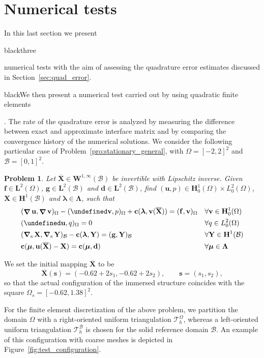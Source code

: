 \documentclass[oneside]{amsart} %
\newtheorem{pro}{Problem}
\let\div\undefined\DeclareMathOperator{\div}{div} %
\DeclareMathOperator*{\Grad}{\boldsymbol\nabla}
\DeclareMathOperator{\grads}{\boldsymbol\nabla_s}
\newcommand\Huo{\mathbf{H}^1_0(\Omega)}%
\newcommand\Ldo{L^2_0(\Omega)} %
\newcommand\Hub{\mathbf{H}^1(\B)} %
\newcommand\LdBd{\mathbf{L}^2(\B)} %
\newcommand\LdOd{\mathbf{L}^2(\Omega)} %
\newcommand\Winftyd{\mathbf{W}^{1,\infty}(\B)}
\newcommand\B{\mathcal B} %
\renewcommand\u{\mathbf{u}} %
\renewcommand\v{\mathbf{v}} %
\renewcommand\d{\mathbf{d}} %
\renewcommand\c{\mathbf{c}} %
\newcommand\f{\mathbf{f}} %
\newcommand\g{\mathbf{g}} %
\newcommand\s{\mathbf{s}} %
\newcommand\X{\mathbf{X}} %
\newcommand\Xbar{\overline{\X}} %
\newcommand\Y{\mathbf{Y}} %
\newcommand\LL{{\boldsymbol{\Lambda}}} %
\newcommand\llambda{\boldsymbol\lambda} %
\newcommand\mmu{{\boldsymbol\mu}} %
\newcommand\T{\mathcal{T}} %
\newcommand\DB{\begin{color}{black}}
\newcommand\BD{\end{color}}
\begin{document}
	\section{Numerical tests}\label{sec:numerical_tests}
	
	In this last section we present \DB three \BD numerical tests with the aim of assessing the quadrature error estimates discussed in Section~\ref{sec:quad_error}. \DB We then present a numerical test carried out by using quadratic finite elements\BD. The rate of the quadrature error is analyzed by measuring the difference between exact and approximate interface matrix and by comparing the convergence history of the numerical solutions. We consider the following particular case of Problem~\ref{pro:stationary_general}, with $\Omega=[-2,2]^2$ and $\B=[0,1]^2$.
	
	\begin{pro}
		\label{pro:stationary_test}
		Let $\Xbar\in\Winftyd$ be invertible with Lipschitz inverse. Given $\f\in \LdOd$, $\g\in \LdBd$ and $\d\in\LdBd$, find $(\u,p)\in\Huo \times \Ldo$, $\X\in \Hub$ and $\llambda\in \LL$, such that
		\begin{subequations}
			\begin{align}
				&(\Grad\u,\Grad\v)_\Omega-(\div\v,p)_\Omega+\c(\llambda,\v(\Xbar))=(\f,\v)_\Omega && %
				\forall\v\in\Huo\\
				&(\div\u,q)_\Omega=0&&\forall q\in \Ldo\\
				& (\grads\X,\grads\Y)_\B-\c(\llambda,\Y)=(\g,\Y)_\B&&\forall\Y\in \Hub \\
				& \c(\mmu,\u(\Xbar)-\X)=\c(\mmu,\d)&&\forall\mmu\in \LL
			\end{align}
		\end{subequations}
	\end{pro}
	
	We set the initial mapping $\Xbar$ to be
	\begin{equation*}
		\Xbar(\s) = (-0.62+2 s_1,-0.62+2 s_2),\qquad\s=(s_1,s_2),
	\end{equation*}
	so that the actual configuration of the immersed structure coincides with the square $\Omega_s=[-0.62,1.38]^2$. 
	
	For the finite element discretization of the above problem, we partition the domain $\Omega$ with a right-oriented uniform triangulation $\T_h^\Omega$, whereas a left-oriented uniform triangulation $\T_h^\B$ is chosen for the solid reference domain $\B$. An example of this configuration with coarse meshes is depicted in Figure~\ref{fig:test_configuration}. 
	
\end{document}
